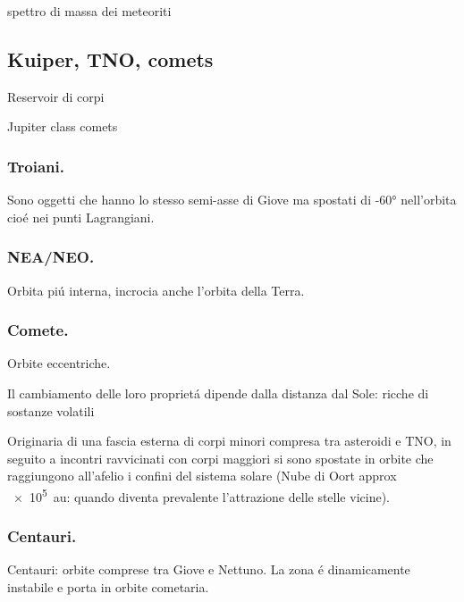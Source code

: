 \begin{itemize}
\begin{wordonframe}{spettro di massa dei meteoriti}
\end{wordonframe}

\subsection{Kuiper, TNO, comets}

\begin{frame}{Reservoir di corpi}

\end{frame}

\begin{wordonframe}{Jupiter class comets}

\end{wordonframe}


\subsubsection{Troiani.}

Sono oggetti che hanno lo stesso semi-asse di Giove ma spostati di \ang{+-60} nell'orbita cio\'e nei punti Lagrangiani.

\subsubsection{NEA/NEO.}

Orbita pi\'u interna, incrocia anche l'orbita della Terra.

\subsubsection{Comete.}
Orbite eccentriche.

Il cambiamento delle loro propriet\'a dipende dalla distanza dal Sole: ricche di sostanze volatili

Originaria di una fascia esterna di corpi minori compresa tra asteroidi e TNO, in seguito a incontri ravvicinati con corpi maggiori si sono spostate in orbite che raggiungono all'afelio i confini del sistema solare (Nube di Oort approx \SI{e5}{\astronomicalunit}: quando diventa prevalente l'attrazione delle stelle vicine).

\subsubsection{Centauri.}

Centauri: orbite comprese tra Giove e Nettuno. La zona \'e dinamicamente instabile e porta in orbite cometaria.


\end{itemize}
